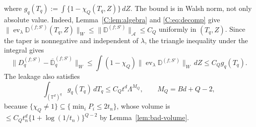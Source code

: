 \documentclass[11pt]{article}
\DeclareMathOperator{\ev}{ev}
\newcommand{\Torus}{\mathbb{T}}
\newcommand{\cA}{\mathcal{A}}
\newcommand{\norm}[1]{\lVert #1\rVert}
\begin{document}
where \(g_q(T_q):=\int\{1-\chi_Q(T_q,Z)\}\,dZ\).
The bound is in Walsh norm, not only absolute value.  Indeed,
Lemma~\ref{C:lem:algebra} and \eqref{C:eq:decomp} give
\(\norm{\ev_\lambda\mathbb D^{(f;S')}(T_q,Z)}_W
 \le\norm{\mathbb D^{(f;S')}}_\cA\le C_Q\) uniformly in \((T_q,Z)\).
Since the taper is nonnegative and independent of \(\lambda\), the
triangle inequality under the integral gives
\[
 \norm{D^{(f;S')}_q-\overline{\mathbb D}^{(f;S')}_q}_W
 \le\int(1-\chi_Q)\norm{\ev_\lambda\mathbb D^{(f;S')}}_W\,dZ
 \le C_Qg_q(T_q).
\]
The leakage also satisfies
\begin{equation}
 \int_{(\Torus^d)^q}g_q(T_q)\,dT_q\le C_Qt^d\Lambda^{M_Q},\qquad M_Q=Bd+Q-2,
 \label{C:eq:ghost}
\end{equation}
because \(\{\chi_Q\ne1\}\subseteq\{\min_iP_i\le2t_n\}\), whose volume is
\(\le C_Qt_n^d\{1+\log(1/t_n)\}^{Q-2}\) by Lemma~\ref{lem:bad-volume}.
\end{document}
